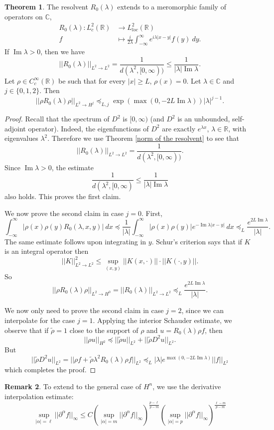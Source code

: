 \documentclass[12pt]{report}
\newcommand{\RR}{\mathbb{R}}
\newcommand{\CC}{\mathbb{C}}
\renewcommand{\Im}{\operatorname{Im}}
\theoremstyle{definition}
\newtheorem{theorem}{Theorem}[chapter]
\newtheorem{remark}[theorem]{Remark}
\begin{document}
\begin{defintion}
\begin{theorem}
The resolvent $R_0(\lambda)$ extends to a meromorphic family of operators on $\CC$,
\begin{align*}
    R_0(\lambda): L^2_c(\RR) &\to L^2_{loc}(\RR)\\
    f &\mapsto \frac{i}{2\lambda} \int_{-\infty}^\infty e^{i\lambda|x-y|} f(y)~dy.
\end{align*}
If $\Im \lambda > 0$, then we have
$$||R_0(\lambda)||_{L^2 \to L^2} = \frac{1}{d(\lambda^2, [0, \infty))} \leq \frac{1}{|\lambda| \Im \lambda}.$$
Let $\rho \in C^\infty_c(\RR)$ be such that for every $|x| \geq L$, $\rho(x) = 0$. Let $\lambda \in \CC$ and $j \in \{0, 1, 2\}$. Then
$$||\rho R_0(\lambda)\rho||_{L^2 \to H^j} \preceq_{L,j} \exp(\max(0, -2L \Im \lambda)) |\lambda|^{j-1}.$$
\end{theorem}
\begin{proof}
Recall that the spectrum of $D^2$ is $[0, \infty)$ (and $D^2$ is an unbounded, self-adjoint operator). Indeed, the eigenfunctions of $D^2$ are exactly $e^{\lambda x}$, $\lambda \in \RR$, with eigenvalues $\lambda^2$. Therefore we use Theorem \ref{norm of the resolvent} to see that
$$||R_0(\lambda)||_{L^2 \to L^2} = \frac{1}{d(\lambda^2, [0, \infty))}.$$
Since $\Im \lambda > 0$, the estimate
$$\frac{1}{d(\lambda^2, [0, \infty)} \leq \frac{1}{|\lambda| \Im \lambda}$$
also holds. This proves the first claim.

We now prove the second claim in case $j = 0$. First, 
$$\int_{-\infty}^\infty |\rho(x)\rho(y)R_0(\lambda, x, y)| ~dx \preceq \frac{1}{|\lambda|} \int_{-\infty}^\infty |\rho(x)\rho(y)| e^{-\Im \lambda|x-y|} ~dx \preceq_L \frac{e^{2L\Im \lambda}}{|\lambda|}.$$
The same estimate follows upon integrating in $y$. Schur's criterion says that if $K$ is an integral operator then
$$||K||_{L^2 \to L^2}^2 \leq \sup_{(x, y)} ||K(x, \cdot)|| \cdot ||K(\cdot, y)||.$$
So
$$||\rho R_0(\lambda)\rho||_{L^2 \to H^0} = ||R_0(\lambda)||_{L^2 \to L^2} \preceq_L \frac{e^{2L \Im \lambda}}{|\lambda|}.$$

We now only need to prove the second claim in case $j = 2$, since we can interpolate for the case $j = 1$. Applying the interior Schauder estimate, we observe that if $\tilde \rho = 1$ close to the support of $\rho$ and $u = R_0(\lambda)\rho f$, then
$$||\rho u||_{H^2} \preceq ||\tilde \rho u||_{L^2} + ||\tilde \rho D^2u||_{L^2}.$$
But
$$||\tilde \rho D^2u||_{L^2} = ||\rho f + \tilde \rho \lambda^2 R_0(\lambda) \rho f||_{L^2} \preceq_L |\lambda| e^{\max(0, -2L \Im \lambda)}||f||_{L^2}$$
which completes the proof.
\end{proof}
\begin{remark}
To extend to the general case of $H^n$, we use the derivative interpolation estimate:
$$\sup_{|\alpha| = \ell} ||\partial^\alpha f||_\infty \le C\left(\sup_{|\alpha| = m} ||\partial^\alpha f||_\infty \right)^{\frac{p - \ell}{p - m}}\left(\sup_{|\alpha| = p} ||\partial^\alpha f||_\infty \right)^{\frac{\ell - m}{p - m}}$$
\end{remark}


\end{defintion}
\end{document}
